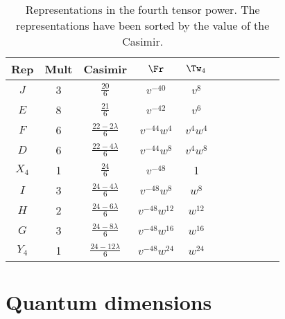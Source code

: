 \documentclass[12pt]{amsart}
\begin{document}
\begin{table}
  \centering
  \medskip
  \begin{tabular}{ccccccccccc}
    \toprule
    Rep & Mult & Casimir & $\Fr$ & $\Tw_4$ \\ \midrule
    $J$ & 3 & $\frac{20}{6}$ & $v^{-40}$ & $v^8$ \\[3pt]
    $E$ & 8 & $\frac{21}{6}$ & $v^{-42}$ & $v^6$ \\[3pt]
    $F$ & 6 & $\frac{22 - 2\lambda}{6}$ & $v^{-44}w^4$ & $v^4w^4$ \\[3pt]
    $D$ & 6 & $\frac{22 - 4\lambda}{6}$ & $v^{-44}w^8$ & $v^4w^8$ \\[3pt]
    $X_4$ & 1 & $\frac{24}{6}$ & $v^{-48}$ & 1\\[3pt]
    $I$ & 3 & $\frac{24 - 4\lambda}{6}$ & $v^{-48}w^8$ & $w^8$\\[3pt]
    $H$ & 2 & $\frac{24 - 6\lambda}{6}$ & $v^{-48}w^{12}$ & $w^{12}$\\[3pt]
    $G$ & 3 & $\frac{24 - 8\lambda}{6}$ & $v^{-48}w^{16}$ & $w^{16}$ \\[3pt]
    $Y_4$ & 1 & $\frac{24 - 12\lambda}{6}$ & $v^{-48}w^{24}$ & $w^{24}$ \\[3pt]
    \bottomrule
  \end{tabular}
  \medskip
  \caption{Representations in the fourth tensor power. The
    representations have been sorted by the value of the Casimir.}
  \label{tab:fourth-tensor}
\end{table}

\section{Quantum dimensions}
\label{sec:quantum-dimensions}
\end{document}
